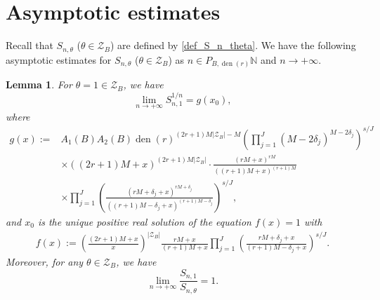 \documentclass[12pt]{article}
\newtheorem{lemma}[theorem]{Lemma}
\numberwithin{equation}{section}
\begin{document}
\section{Asymptotic estimates}\label{sec_4}

Recall that $S_{n,\theta}$ ($\theta \in \mathcal{Z}_B$) are defined by \eqref{def_S_n_theta}. We have the following asymptotic estimates for $S_{n,\theta}$ ($\theta \in \mathcal{Z}_B$) as $n \in P_{B,\operatorname{den}(r)}\mathbb{N}$ and $n \to +\infty$.

\begin{lemma}\label{lem_ana}
For $\theta =1 \in \mathcal{Z}_B$, we have
\[ \lim_{n \to +\infty} S_{n,1}^{1/n} = g(x_0), \]
where 
\begin{align*}
	g(x) :=& A_1(B)A_2(B) \operatorname{den}(r)^{(2r+1)M|\mathcal{Z}_B| - M} \left( \prod_{j=1}^{J} (M-2\delta_j)^{M-2\delta_j} \right)^{s/J} \\
	&\times \left( (2r+1)M + x \right)^{(2r+1)M|\mathcal{Z}_B|} \cdot \frac{(rM+x)^{rM}}{((r+1)M+x)^{(r+1)M}} \\
	&\times \prod_{j=1}^{J} \left( \frac{(rM+\delta_j+x)^{rM+\delta_j}}{\left( (r+1)M - \delta_j + x \right)^{(r+1)M-\delta_j}} \right)^{s/J},
\end{align*}
and $x_0$ is the unique positive real solution of the equation $f(x)=1$ with
\begin{align*}
	f(x) := \left( \frac{(2r+1)M+x}{x} \right)^{|\mathcal{Z}_B|} \frac{rM+x}{(r+1)M + x} \prod_{j=1}^{J} \left( \frac{rM+\delta_j+x}{(r+1)M-\delta_j+x} \right)^{s/J}.
\end{align*}
Moreover, for any $\theta \in \mathcal{Z}_B$, we have
\[ \lim_{n \to +\infty} \frac{S_{n,1}}{S_{n,\theta}}  = 1.  \]
\end{lemma}
\end{document}
